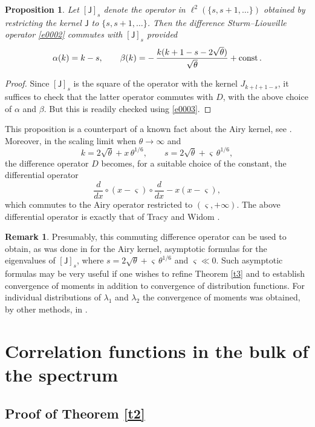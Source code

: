 \documentclass[12pt]{amsart}
\newcommand{\la}{\lambda}
\newcommand{\al}{\alpha}
\newcommand{\be}{\beta}
\newcommand{\J}{\mathsf{J}}
\newcommand{\ix}{\theta}
\theoremstyle{plain}
\newtheorem{proposition}[lemma]{Proposition}
\theoremstyle{definition}
\newtheorem{remark}[lemma]{Remark}
\numberwithin{equation}{section}
\begin{document}
\begin{proposition} Let $[\J]_s$ denote the operator in
$\ell^2(\{s,s+1,\dots\})$ obtained by restricting the kernel
$\J$ to $\{s,s+1,\dots\}$. Then the difference
Sturm--Liouville operator \eqref{e0002} commutes with $[\J]_s$ provided
$$
\al(k)=k-s, \qquad
\be(k)=-\,\frac{k(k+1-s-2\sqrt\ix)}{\sqrt\ix}+\textup{const} \,.
$$
\end{proposition}

\begin{proof} Since $[\J]_s$ is the square of the operator with the
kernel $J_{k+l+1-s}$, it suffices to check that the latter
operator commutes with $D$, with the above choice of  $\al$ and $\be$.
But this is readily checked using \eqref{e0003}. 
\end{proof}

This proposition is a counterpart of a known fact about the Airy kernel, see
\cite{TW}. Moreover, in the scaling limit when  $\ix\to\infty$ and 
$$
k=2\sqrt\ix+x\,\ix^{1/6}, \qquad s=2\sqrt\ix+\varsigma\,\ix^{1/6}, 
$$
the difference operator $D$
becomes, for a suitable choice of the constant, the differential operator 
$$
\frac d{dx}\circ(x-\varsigma)\circ \frac d{dx} -x(x-\varsigma), 
$$
which commutes to the Airy operator restricted to $(\varsigma,+\infty)$.  The
above differential 
operator  is exactly that of Tracy and Widom \cite{TW}.

\begin{remark}
Presumably, this commuting difference operator can be used to
obtain, as was done in \cite{TW} for the Airy kernel, 
asymptotic formulas for the eigenvalues of $[\J]_s$, where
$s=2\sqrt\ix+\varsigma\,\ix^{1/6}$ and $\varsigma\ll 0$. 
Such asymptotic formulas may be very useful if one wishes
to refine Theorem \ref{t3} and to establish
convergence of moments in addition to convergence of 
distribution functions. For individual distributions of
$\la_1$ and $\la_2$ the convergence of moments was 
obtained, by other methods, in \cite{BDJ1,BDJ2}. 
\end{remark} 
 



\section{Correlation functions in the bulk of the spectrum}\label{s3}

\subsection{Proof of Theorem \ref{t2}}
\end{document}
